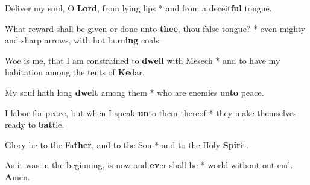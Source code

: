 \begin{multicols}{2}
	Deliver my soul, O \textbf{Lord}, from lying lips * and from a deceit\textbf{ful} tongue.
	
	What reward shall be given or done unto \textbf{thee}, thou false tongue? * even mighty and sharp arrows, with hot burn\textbf{ing} coals.
	
	Woe is me, that I am constrained to \textbf{dwell} with Mesech * and to have my habitation among the tents of \textbf{Ke}dar.
	
	My soul hath long \textbf{dwelt} among them * who are enemies un\textbf{to} peace.
	
	I labor for peace, but when I speak \textbf{un}to them thereof * they make themselves ready to \textbf{bat}tle.
	
	Glory be to the Fa\textbf{ther}, and to the Son * and to the Holy \textbf{Spir}it.
	
	As it was in the beginning, is now and \textbf{ev}er shall be * world without out end. \textbf{A}men.
\end{multicols}